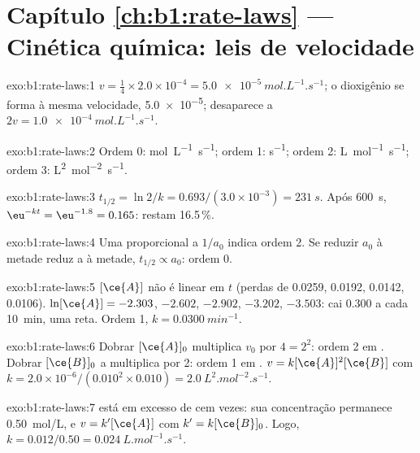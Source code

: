 \section*{Capítulo \ref{ch:b1:rate-laws} --- Cinética química: leis de velocidade}

\begin{solution}{exo:b1:rate-laws:1}
$v = \frac14 \times 2.0 \times 10^{-4} = \qty{5.0e-5}{mol.L^{-1}.s^{-1}}$;
o dioxigênio se forma à mesma velocidade, \qty{5.0e-5}{};  desaparece a
$2v = \qty{1.0e-4}{mol.L^{-1}.s^{-1}}$.
\end{solution}

\begin{solution}{exo:b1:rate-laws:2}
Ordem 0: \unit{mol.L^{-1}.s^{-1}}; ordem 1: \unit{s^{-1}}; ordem 2:
\unit{L.mol^{-1}.s^{-1}}; ordem 3: \unit{L^2.mol^{-2}.s^{-1}}.
\end{solution}

\begin{solution}{exo:b1:rate-laws:3}
$t_{1/2} = \ln2/k = 0.693/(3.0 \times 10^{-3}) = \qty{231}{s}$. Após
\qty{600}{s}, $\eu^{-kt} = \eu^{-1.8} = 0.165$: restam 16.5\,\%.
\end{solution}

\begin{solution}{exo:b1:rate-laws:4}
Uma  proporcional a $1/a_0$ indica ordem 2. Se reduzir $a_0$ à
metade reduz a  à metade, $t_{1/2} \propto a_0$: ordem 0.
\end{solution}

\begin{solution}{exo:b1:rate-laws:5}
$[\ce{A}]$ não é linear em $t$ (perdas de 0.0259, 0.0192, 0.0142, 0.0106).
$\ln[\ce{A}] = -2.303$, $-2.602$, $-2.902$, $-3.202$, $-3.503$: cai
0.300 a cada \qty{10}{min}, uma reta. Ordem 1, $k =
\qty{0.0300}{min^{-1}}$.
\end{solution}

\begin{solution}{exo:b1:rate-laws:6}
Dobrar $[\ce{A}]_0$ multiplica $v_0$ por $4 = 2^2$: ordem 2 em .
Dobrar $[\ce{B}]_0$ a multiplica por 2: ordem 1 em . $v =
k[\ce{A}]^2[\ce{B}]$ com $k = 2.0 \times 10^{-6}/(0.010^2 \times 0.010) =
\qty{2.0}{L^2.mol^{-2}.s^{-1}}$.
\end{solution}

\begin{solution}{exo:b1:rate-laws:7}
 está em excesso de cem vezes: sua concentração permanece
\qty{0.50}{mol/L}, e $v = k'[\ce{A}]$ com $k' = k[\ce{B}]_0$. Logo,
$k = 0.012/0.50 = \qty{0.024}{L.mol^{-1}.s^{-1}}$.
\end{solution}

